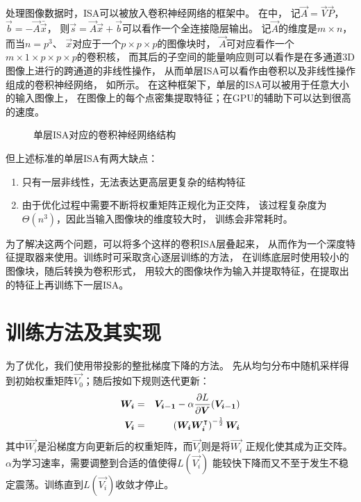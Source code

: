 处理图像数据时，ISA可以被放入卷积神经网络的框架中。
在中，
记$\vec{A} = \vec{V}\vec{P}$，$\vec{b}=-\vec{A}\bar{\vec{x}}$，
则$\vec{s}=\vec{A}\vec{x} + \vec{b}$可以看作一个全连接隐层输出。
记$\vec{A}$的维度是$m\times n$，而当$n=p^3$、
$\vec{x}$对应于一个$p\times p \times p$的图像块时，
$\vec{A}$可对应看作一个$m\times 1 \times p \times p \times p$的卷积核，
而其后的子空间的能量响应则可以看作是在多通道3D图像上进行的跨通道的非线性操作，
从而单层ISA可以看作由卷积以及非线性操作组成的卷积神经网络，
如所示。
在这种框架下，单层的ISA可以被用于任意大小的输入图像上，
在图像上的每个点密集提取特征；在GPU的辅助下可以达到很高的速度。

\begin{figure}[h!]
    \caption{单层ISA对应的卷积神经网络结构}
    \label{fig:isa:nn}
\end{figure}

但上述标准的单层ISA有两大缺点：
\begin{enumerate}
    \item 只有一层非线性，无法表达更高层更复杂的结构特征
    \item 由于优化过程中需要不断将权重矩阵正规化为正交阵，
        该过程复杂度为$\Theta(n^3)$，因此当输入图像块的维度较大时，
        训练会非常耗时。
\end{enumerate}

为了解决这两个问题，可以将多个这样的卷积ISA层叠起来，
从而作为一个深度特征提取器来使用。训练时可采取贪心逐层训练的方法，
在训练底层时使用较小的图像块，随后转换为卷积形式，
用较大的图像块作为输入并提取特征，在提取出的特征上再训练下一层ISA。


\section{训练方法及其实现}
为了优化，我们使用带投影的整批梯度下降的方法。
先从均匀分布中随机采样得到初始权重矩阵$\vec{V_0}$；随后按如下规则迭代更新：
\begin{eqnarray}
    \boldsymbol{W_i} &=& \boldsymbol{V_{i-1}} - \alpha \frac{\partial L}{\partial
        \boldsymbol{V}}(\boldsymbol{V_{i-1}}) \nonumber  \\
        \boldsymbol{V_i} &=& \left(
            \boldsymbol{W_i}\boldsymbol{W_i}^\intercal\right)^{-\frac{1}{2}}\boldsymbol{W_i}
    \label{eqn:isa:train}
\end{eqnarray}
其中$\vec{W_i}$是沿梯度方向更新后的权重矩阵，而$\vec{V_i}$则是将$\vec{W_i}$
正规化使其成为正交阵。$\alpha$为学习速率，需要调整到合适的值使得$L(\vec{V_i})$
能较快下降而又不至于发生不稳定震荡。训练直到$L(\vec{V_i})$收敛才停止。

